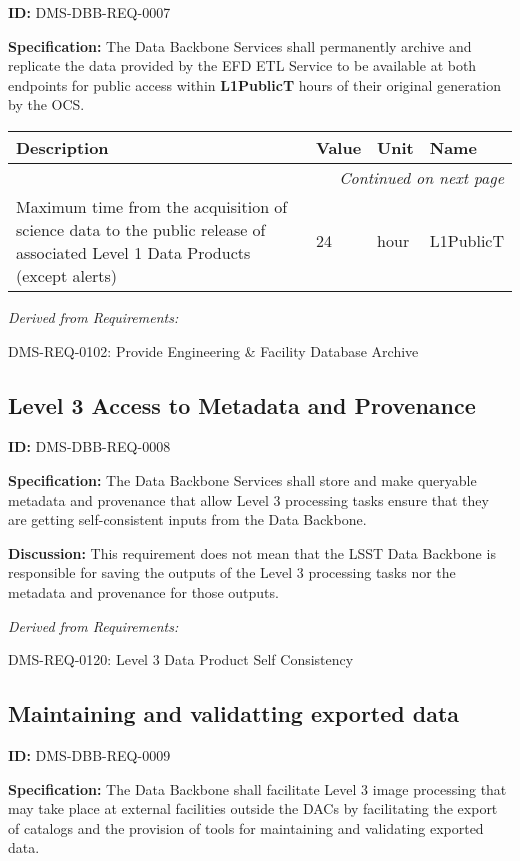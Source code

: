 \documentclass[SE,toc]{lsstdoc}
\makeatletter
\newcommand{\paramname}[1]{\hspace{0pt}#1}
\newcommand{\unitname}[1]{\hspace{0pt}#1}
\newenvironment{parameters}[0]{%
\setlength\LTleft{0pt}
\setlength\LTright{\fill}
\begin{small}
\begin{longtable}[]{|p{0.49\textwidth}|l|p{0.6in}|p{1.70in}@{}|}

\hline \textbf{Description} & \textbf{Value} & \textbf{Unit} & \textbf{Name} \\ \hline
\endhead

\hline \multicolumn{4}{r}{\emph{Continued on next page}} \\
\endfoot

\hline\hline
\endlastfoot
}{%
\hline
\end{longtable}
\end{small}
}
\makeatother
\begin{document}
\label{DMS-DBB-REQ-0007}
\textbf{ID:} DMS-DBB-REQ-0007

\textbf{Specification:}
The Data Backbone Services shall permanently archive and replicate the data provided by the EFD ETL Service to be available at both endpoints for public access within \textbf{L1PublicT} hours of their original generation by the OCS.

\begin{parameters}
Maximum time from the acquisition of science data to the public release of associated Level 1 Data Products (except alerts)
&
24
&
\unitname{%
hour
}
&
\paramname{%
L1PublicT
} \\\hline
\end{parameters}

\emph{Derived from Requirements:}

DMS-REQ-0102:
Provide Engineering \& Facility Database Archive \newline

\subsection{Level 3 Access to Metadata and Provenance}

\label{DMS-DBB-REQ-0008}
\textbf{ID:} DMS-DBB-REQ-0008

\textbf{Specification:}
The Data Backbone Services shall store and make queryable metadata and provenance that allow Level 3 processing tasks ensure that they are getting self-consistent inputs from the Data Backbone.

\textbf{Discussion:}
This requirement does not mean that the LSST Data Backbone is responsible for saving the outputs of the Level 3 processing tasks nor the metadata and provenance for those outputs.

\emph{Derived from Requirements:}

DMS-REQ-0120:
Level 3 Data Product Self Consistency \newline

\subsection{Maintaining and validatting exported data}

\label{DMS-DBB-REQ-0009}
\textbf{ID:} DMS-DBB-REQ-0009

\textbf{Specification:}
The Data Backbone shall facilitate Level 3 image processing that may take place at external facilities outside the DACs by facilitating the export of catalogs and the provision of tools for maintaining and validating exported data.
\end{document}
